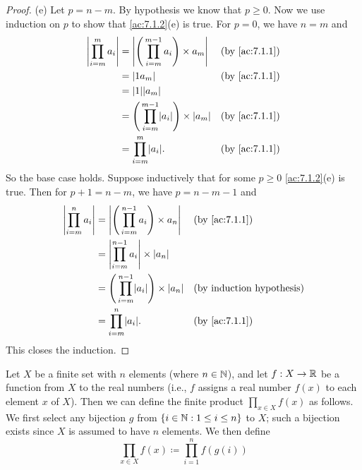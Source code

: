 \begin{proof}{(e)}
  Let \(p = n - m\).
  By hypothesis we know that \(p \geq 0\).
  Now we use induction on \(p\) to show that \cref{ac:7.1.2}(e) is true.
  For \(p = 0\), we have \(n = m\) and
  \begin{align*}
    \abs{\prod_{i = m}^m a_i} & = \abs{\Bigg(\prod_{i = m}^{m - 1} a_i\Bigg) \times a_m}       &  & \text{(by \cref{ac:7.1.1})} \\
                              & = \abs{1a_m}                                                   &  & \text{(by \cref{ac:7.1.1})} \\
                              & = \abs{1}\abs{a_m}                                                                              \\
                              & = \Bigg(\prod_{i = m}^{m - 1} \abs{a_i}\Bigg) \times \abs{a_m} &  & \text{(by \cref{ac:7.1.1})} \\
                              & = \prod_{i = m}^m \abs{a_i}.                                   &  & \text{(by \cref{ac:7.1.1})}
  \end{align*}
  So the base case holds.
  Suppose inductively that for some \(p \geq 0\) \cref{ac:7.1.2}(e) is true.
  Then for \(p + 1 = n - m\), we have \(p = n - m - 1\) and
  \begin{align*}
    \abs{\prod_{i = m}^n a_i} & = \abs{\Bigg(\prod_{i = m}^{n - 1} a_i\Bigg) \times a_n}       &  & \text{(by \cref{ac:7.1.1})}      \\
                              & = \abs{\prod_{i = m}^{n - 1} a_i} \times \abs{a_n}                                                   \\
                              & = \Bigg(\prod_{i = m}^{n - 1} \abs{a_i}\Bigg) \times \abs{a_n} &  & \text{(by induction hypothesis)} \\
                              & = \prod_{i = m}^n \abs{a_i}.                                   &  & \text{(by \cref{ac:7.1.1})}
  \end{align*}
  This closes the induction.
\end{proof}

\begin{ac}\label{ac:7.1.3}
  Let \(X\) be a finite set with \(n\) elements (where \(n \in \mathbb{N}\)), and let \(f : X \to \mathbb{R}\) be a function from \(X\) to the real numbers
  (i.e., \(f\) assigns a real number \(f(x)\) to each element \(x\) of \(X\)).
  Then we can define the finite product \(\prod_{x \in X} f(x)\) as follows.
  We first select any bijection \(g\) from \(\{i \in \mathbb{N} : 1 \leq i \leq n\}\) to \(X\);
  such a bijection exists since \(X\) is assumed to have \(n\) elements.
  We then define
  \[
    \prod_{x \in X} f(x) \coloneqq \prod_{i = 1}^n f(g(i))
  \]
\end{ac}

